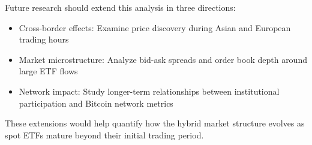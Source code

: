 \documentclass{article} %
\begin{document}
Future research should extend this analysis in three directions:
\begin{itemize}
    \item Cross-border effects: Examine price discovery during Asian and European trading hours
    \item Market microstructure: Analyze bid-ask spreads and order book depth around large ETF flows
    \item Network impact: Study longer-term relationships between institutional participation and Bitcoin network metrics
\end{itemize}

These extensions would help quantify how the hybrid market structure evolves as spot ETFs mature beyond their initial trading period.



\end{document}
